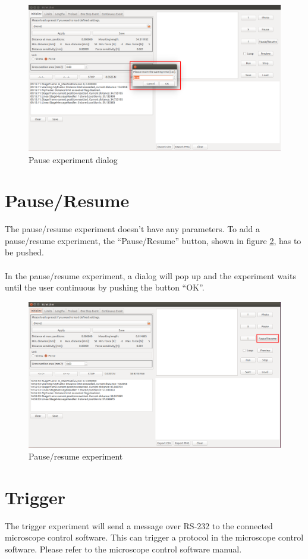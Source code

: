 \begin{figure}[!ht]
	\centering
		\includegraphics[width=1.0\textwidth]{images/Pause2}
	\caption{Pause experiment dialog}
	\label{fig:pause2}
\end{figure}

\section{Pause/Resume}
The pause/resume experiment doesn't have any parameters. To add a pause/resume experiment, the ``Pause/Resume'' button, shown in figure \ref{fig:pauseresume}, has to be pushed.
\\
\\
In the pause/resume experiment, a dialog will pop up and the experiment waits until the user continuous by pushing the button ``OK''.

\begin{figure}[!ht]
	\centering
		\includegraphics[width=1.0\textwidth]{images/PauseResume}
	\caption{Pause/resume experiment}
	\label{fig:pauseresume}
\end{figure}

\section{Trigger}
The trigger experiment will send a message over RS-232 to the connected microscope control software. This can trigger a protocol in the microscope control software. Please refer to the microscope control software manual.